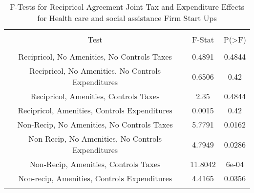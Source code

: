 
\begin{table}[!htbp] \centering 
  \caption{F-Tests for Recipricol Agreement Joint Tax and Expenditure Effects for Health care and social assistance Firm Start Ups} 
  \label{62Ftests} 
\begin{tabular}{@{\extracolsep{5pt}} ccc} 
\\[-1.8ex]\hline 
\hline \\[-1.8ex] 
Test & F-Stat & P(\textgreater F) \\ 
\hline \\[-1.8ex] 
Recipricol, No Amenities, No Controls Taxes & 0.4891 & 0.4844 \\ 
Recipricol, No Amenities, No Controls Expenditures & 0.6506 & 0.42 \\ 
Recipricol, Amenities, Controls Taxes & 2.35 & 0.4844 \\ 
Recipricol, Amenities, Controls Expenditures & 0.0015 & 0.42 \\ 
Non-Recip, No Amenities, No Controls Taxes & 5.7791 & 0.0162 \\ 
Non-Recip, No Amenities, No Controls Expenditures & 4.7949 & 0.0286 \\ 
Non-Recip, Amenities, Controls Taxes & 11.8042 & 6e-04 \\ 
Non-recip, Amenities, Controls Expenditures & 4.4165 & 0.0356 \\ 
\hline \\[-1.8ex] 
\end{tabular} 
\end{table} 
